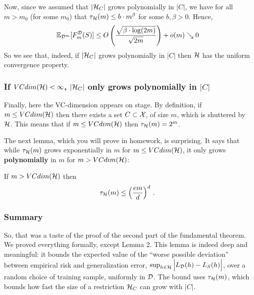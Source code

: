 Now, since we assumed that $|\mathcal{H}_C|$ grows polynomially in $|C|$, 
we have for all $m>m_0$ (for some $m_0$) that  $\tau_{\mathcal{H}}(m) \leq b\cdot m^\beta$
for some $b,\beta>0$. Hence,
\[
  \mathbb{E}_{\mathcal{D}^m} [F_m^{\mathcal{D}}(S)] \leq O\left(\frac{ \sqrt{\beta\cdot\log(2m)}} {\sqrt{2m}}\right) + o(m) \searrow 0
\]
So we see that, indeed, if $|\mathcal{H}_C|$ grows polynomially in $|C|$ then
$\mathcal{H}$ has the uniform convergence property.

\subsubsection{If $VCdim(\mathcal{H})<\infty$,
$|\mathcal{H}_C|$ only grows polynomially in $|C|$}

Finally, here the VC-dimension appears on stage. 
By definition, if $m\leq VCdim(\mathcal{H})$ then there exists a set $C\subset \mathcal{X}$, of
size $m$, which is shuttered by $\mathcal{H}$. This means that if $m\leq VCdim(\mathcal{H})$
then $\tau_{\mathcal{H}}(m) = 2^m$. 

The next lemma, which you will prove in
homework, is surprising. It says that
while $\tau_{\mathcal{H}}(m)$ grows exponentially in $m$ for $m\leq
VCdim(\mathcal{H})$, it only grows {\bf polynomially} in $m$ for $m>VCdim(\mathcal{H})$:

\begin{lemma} \label{perles:lem} 
    If $m>VCdim(\mathcal{H})$ then
    \[
        \tau_{\mathcal{H}}(m) \leq \left( \frac{em}{d} \right)^d\,.
    \]
\end{lemma}

\subsubsection{Summary}

So, that was a taste of the  proof of the second part of the fundamental
theorem. We proved everything formally, except Lemma 2. 
 This lemma is indeed deep and meaningful: it bounds the
expected value of the ``worse possible deviation''  between empirical risk 
and generalization error, 
$\sup_{h\in\mathcal{H}} \Big| L_{\mathcal{D}}(h) - L_S(h) \Big|$, over a random choice of training
sample, uniformly in $\mathcal{D}$. The bound uses $\tau_{\mathcal{H}}(m)$, which bounds how
fast the size of a restriction $\mathcal{H}_C$ can grow with $|C|$.










